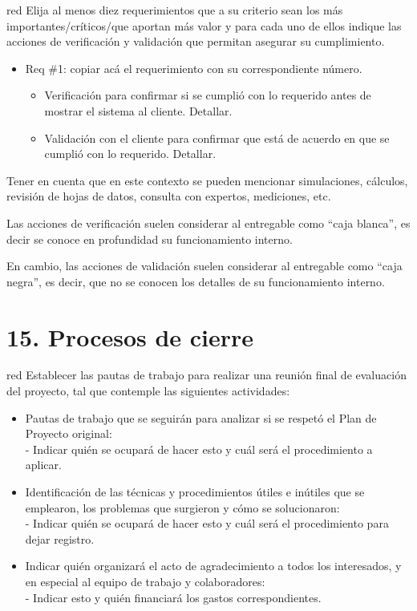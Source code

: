 \documentclass[
11pt, %
]{charter}
\begin{document}
\begin{consigna}{red}
Elija al menos diez requerimientos que a su criterio sean los más importantes/críticos/que aportan más valor y para cada uno de ellos indique las acciones de verificación y validación que permitan asegurar su cumplimiento.

\begin{itemize} 
\item Req \#1: copiar acá el requerimiento con su correspondiente número.

\begin{itemize}
	\item Verificación para confirmar si se cumplió con lo requerido antes de mostrar el sistema al cliente. Detallar.
	\item Validación con el cliente para confirmar que está de acuerdo en que se cumplió con lo requerido. Detallar. 
\end{itemize}

\end{itemize}

Tener en cuenta que en este contexto se pueden mencionar simulaciones, cálculos, revisión de hojas de datos, consulta con expertos, mediciones, etc.  

Las acciones de verificación suelen considerar al entregable como ``caja blanca'', es decir se conoce en profundidad su funcionamiento interno.  

En cambio, las acciones de validación suelen considerar al entregable como ``caja negra'', es decir, que no se conocen los detalles de su funcionamiento interno.

\end{consigna}

\section{15. Procesos de cierre}    
\label{sec:cierre}

\begin{consigna}{red}
Establecer las pautas de trabajo para realizar una reunión final de evaluación del proyecto, tal que contemple las siguientes actividades:

\begin{itemize}
	\item Pautas de trabajo que se seguirán para analizar si se respetó el Plan de Proyecto original:\\
	 - Indicar quién se ocupará de hacer esto y cuál será el procedimiento a aplicar. 
	\item Identificación de las técnicas y procedimientos útiles e inútiles que se emplearon, los problemas que surgieron y cómo se solucionaron:\\
	 - Indicar quién se ocupará de hacer esto y cuál será el procedimiento para dejar registro.
	\item Indicar quién organizará el acto de agradecimiento a todos los interesados, y en especial al equipo de trabajo y colaboradores:\\
	  - Indicar esto y quién financiará los gastos correspondientes.
\end{itemize}

\end{consigna}
\end{document}
